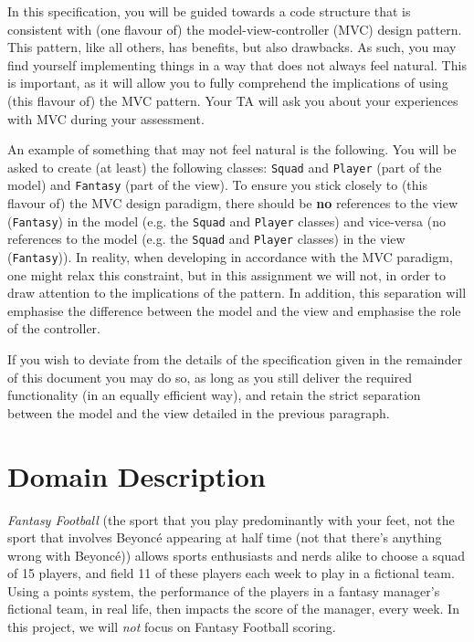 \documentclass[11pt]{article}
\begin{document}
In this specification, you will be guided towards a code structure that is consistent with (one flavour of) the model-view-controller (MVC) design pattern. This pattern, like all others, has benefits, but also drawbacks. As such, you may find yourself implementing things in a way that does not always feel natural. This is important, as it will allow you to fully comprehend the implications of using (this flavour of) the MVC pattern. Your TA will ask you about your experiences with MVC during your assessment.

An example of something that may not feel natural is the following. You will be asked to create (at least) the following classes: \texttt{Squad} and \texttt{Player} (part of the model) and \texttt{Fantasy} (part of the view). To ensure you stick closely to (this flavour of) the MVC design paradigm, there should be \textbf{no} references to the view (\texttt{Fantasy}) in the model (e.g. the \texttt{Squad} and \texttt{Player} classes) and vice-versa (no references to the model (e.g. the \texttt{Squad} and \texttt{Player} classes) in the view (\texttt{Fantasy})). In reality, when developing in accordance with the MVC paradigm, one might relax this constraint, but in this assignment we will not, in order to draw attention to the implications of the pattern. In addition, this separation will emphasise the difference between the model and the view and emphasise the role of the controller.

If you wish to deviate from the details of the specification given in the remainder of this document you may do so, as long as you still deliver the required functionality (in an equally efficient way), and retain the strict separation between the model and the view detailed in the previous paragraph.

\section{Domain Description}
\label{sec:domain}

\emph{Fantasy Football} (the sport that you play predominantly with your feet, not the sport that involves Beyonc{\'e} appearing at half time (not that there's anything wrong with Beyonc{\'e})) allows sports enthusiasts and nerds alike to choose a squad of 15 players, and field 11 of these players each week to play in a fictional team. Using a points system, the performance of the players in a fantasy manager's fictional team, in real life, then impacts the score of the manager, every week. In this project, we will \emph{not} focus on Fantasy Football scoring. 
\end{document}
